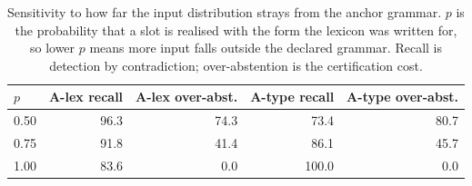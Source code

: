 \begin{table}[t]
\centering
\caption{Sensitivity to how far the input distribution strays from the anchor grammar. $p$ is the probability that a slot is realised with the form the lexicon was written for, so lower $p$ means more input falls outside the declared grammar. Recall is detection by contradiction; over-abstention is the certification cost.}
\label{tab:sensitivity}
\small
\begin{tabular}{lrrrr}
\toprule
$p$ & A-lex recall & A-lex over-abst. & A-type recall & A-type over-abst. \\
\midrule
0.50 & 96.3 & 74.3 & 73.4 & 80.7 \\
0.75 & 91.8 & 41.4 & 86.1 & 45.7 \\
1.00 & 83.6 & 0.0 & 100.0 & 0.0 \\
\bottomrule
\end{tabular}
\end{table}
